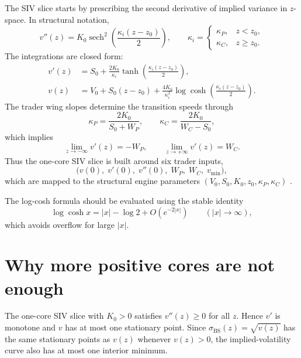 \documentclass[11pt]{article}
\DeclareMathOperator{\sech}{sech}
\newcommand{\bsigma}{\sigma_{\mathrm{BS}}}
\begin{document}
The SIV slice starts by prescribing the second derivative of implied variance in $z$-space.  In structural notation,
\begin{equation}
  v''(z)
  =K_0\sech^2\!\left(\frac{\kappa_i(z-z_0)}{2}\right),
  \qquad
  \kappa_i=
  \begin{cases}
    \kappa_P, & z<z_0,\\
    \kappa_C, & z\ge z_0.
  \end{cases}
  \label{eq:siv-convexity}
\end{equation}
The integrations are closed form:
\begin{align}
  v'(z)
  &= S_0+\frac{2K_0}{\kappa_i}
  \tanh\!\left(\frac{\kappa_i(z-z_0)}{2}\right),
  \label{eq:siv-slope}\\
  v(z)
  &= V_0+S_0(z-z_0)
  +\frac{4K_0}{\kappa_i^2}
  \log\cosh\!\left(\frac{\kappa_i(z-z_0)}{2}\right).
  \label{eq:siv-variance}
\end{align}
The trader wing slopes determine the transition speeds through
\begin{equation}
  \kappa_P=\frac{2K_0}{S_0+W_P},
  \qquad
  \kappa_C=\frac{2K_0}{W_C-S_0},
  \label{eq:siv-wing-map}
\end{equation}
which implies
\begin{equation}
  \lim_{z\to-\infty}v'(z)=-W_P,
  \qquad
  \lim_{z\to+\infty}v'(z)=W_C.
  \label{eq:siv-wing-limits}
\end{equation}
Thus the one-core SIV slice is built around six trader inputs,
\begin{equation}
  \big(v(0),\;v'(0),\;v''(0),\;W_P,\;W_C,\;v_{\min}\big),
  \label{eq:siv-trader-params}
\end{equation}
which are mapped to the structural engine parameters $(V_0,S_0,K_0,z_0,\kappa_P,\kappa_C)$ \cite{sivdoc}.

The log-cosh formula should be evaluated using the stable identity
\begin{equation}
  \log\cosh x = |x|-\log 2+O(e^{-2|x|})
  \qquad (|x|\to\infty),
  \label{eq:safe-logcosh}
\end{equation}
which avoids overflow for large $|x|$.

\section{Why more positive cores are not enough}
\label{sec:positive-cores}

The one-core SIV slice with $K_0>0$ satisfies $v''(z)\ge0$ for all $z$.  Hence $v'$ is monotone and $v$ has at most one stationary point.  Since $\bsigma(z)=\sqrt{v(z)}$ has the same stationary points as $v(z)$ whenever $v(z)>0$, the implied-volatility curve also has at most one interior minimum.
\end{document}
